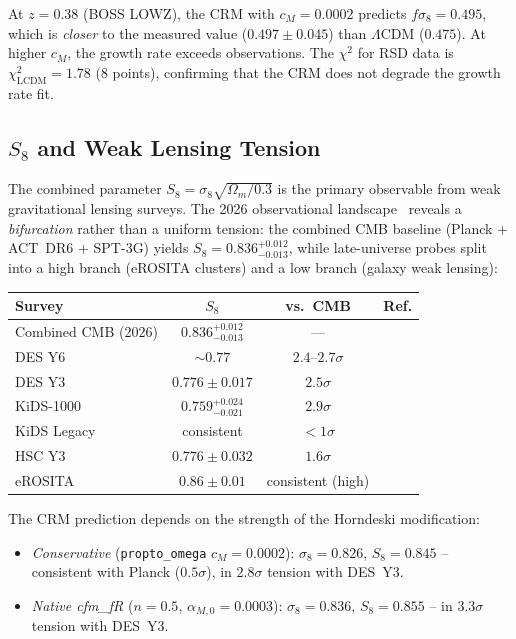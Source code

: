 \documentclass[aps,prd,twocolumn,superscriptaddress,nofootinbib]{revtex4-2}
\begin{document}
At $z = 0.38$ (BOSS LOWZ), the CRM with $c_M = 0.0002$ predicts $f\sigma_8 = 0.495$, which is \textit{closer} to the measured value ($0.497 \pm 0.045$) than $\Lambda$CDM ($0.475$). At higher $c_M$, the growth rate exceeds observations. The $\chi^2$ for RSD data is $\chi^2_{\mathrm{LCDM}} = 1.78$ (8 points), confirming that the CRM does not degrade the growth rate fit.

\subsection{$S_8$ and Weak Lensing Tension}
\label{subsec:s8_comparison}

The combined parameter $S_8 = \sigma_8\sqrt{\Omega_m/0.3}$ is the primary observable from weak gravitational lensing surveys. The 2026 observational landscape~\cite{S8Review2026} reveals a \emph{bifurcation} rather than a uniform tension: the combined CMB baseline (Planck + ACT~DR6 + SPT-3G) yields $S_8 = 0.836^{+0.012}_{-0.013}$, while late-universe probes split into a high branch (eROSITA clusters) and a low branch (galaxy weak lensing):

\begin{center}
\small
\begin{tabular}{lccc}
\toprule
\textbf{Survey} & $S_8$ & \textbf{vs.\ CMB} & \textbf{Ref.} \\
\midrule
Combined CMB (2026) & $0.836^{+0.012}_{-0.013}$ & --- & \cite{S8Review2026} \\
\midrule
DES Y6 & $\sim 0.77$ & $2.4$--$2.7\sigma$ & \cite{DESY6} \\
DES Y3 & $0.776 \pm 0.017$ & $2.5\sigma$ & \cite{DESY3} \\
KiDS-1000 & $0.759^{+0.024}_{-0.021}$ & $2.9\sigma$ & \cite{KiDS2021} \\
KiDS Legacy & consistent & $< 1\sigma$ & \cite{S8Review2026} \\
HSC Y3 & $0.776 \pm 0.032$ & $1.6\sigma$ & \\
eROSITA & $0.86 \pm 0.01$ & consistent (high) & \\
\bottomrule
\end{tabular}
\end{center}

The CRM prediction depends on the strength of the Horndeski modification:
\begin{itemize}
\item \textit{Conservative} (\texttt{propto\_omega} $c_M = 0.0002$): $\sigma_8 = 0.826$, $S_8 = 0.845$ -- consistent with Planck ($0.5\sigma$), in $2.8\sigma$ tension with DES~Y3.
\item \textit{Native cfm\_fR} ($n = 0.5$, $\alpha_{M,0} = 0.0003$): $\sigma_8 = 0.836$, $S_8 = 0.855$ -- in $3.3\sigma$ tension with DES~Y3.
\end{itemize}
\end{document}
